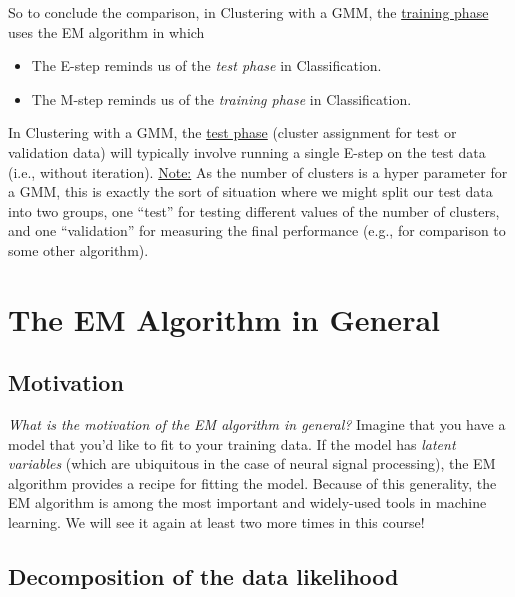\documentclass[11pt]{article}
\begin{document}
So to conclude the comparison, in Clustering with a GMM, the \underline{training
phase} uses the EM algorithm in which
\begin{itemize}
  \item The E-step reminds us of the \textit{test phase} in Classification.
  \item The M-step reminds us of the \textit{training phase} in Classification.
\end{itemize}
In Clustering with a GMM, the \underline{test phase} (cluster assignment for
test or validation data) will typically involve running a single E-step on the
test data (i.e., without iteration). \underline{Note:} As the number of clusters
is a hyper parameter for a GMM, this is exactly the sort of situation where we
might split our test data into two groups, one ``test'' for testing different
values of the number of clusters, and one ``validation'' for measuring the final
performance (e.g., for comparison to some other algorithm).

\section{The EM Algorithm in General}
\subsection{Motivation}
\textit{What is the motivation of the EM algorithm in general?} Imagine that you
have a model that you'd like to fit to your training data. If the model has
\textit{latent variables} (which are ubiquitous in the case of neural signal
processing), the EM algorithm provides a recipe for fitting the model. Because
of this generality, the EM algorithm is among the most important and widely-used
tools in machine learning. We will see it again at least two more times in this
course!

\subsection{Decomposition of the data likelihood}
\end{document}
